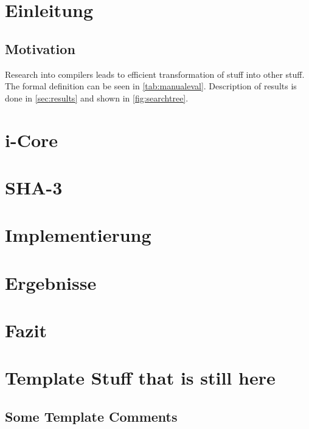 \chapter{Einleitung}
\label{sec:Einleitung}


\section{Motivation}
\label{sec:motivation}
Research into compilers leads to efficient transformation of stuff into other stuff.
The formal definition can be seen in \cref{tab:manualeval}.
Description of results is done in \cref{sec:results} and shown in \cref{fig:searchtree}.

\chapter{i-Core}

\chapter{SHA-3}


\chapter{Implementierung}
\label{sec:first_iteration}


\newpage


\newpage


\chapter{Ergebnisse}

\chapter{Fazit}

\chapter{Template Stuff that is still here}

\section{Some Template Comments}
\label{sec:comments}

